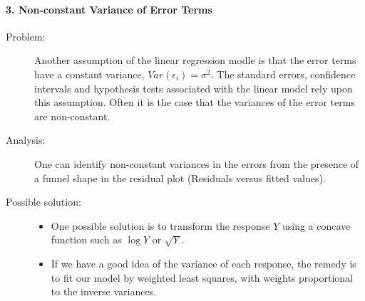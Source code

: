 \documentclass[a4paper]{article}
\begin{document}
						
						\paragraph{3. Non-constant Variance of Error Terms}
						\begin{description}
							\item[Problem:]	Another assumption of the linear regression modle is that the error terms have a constant variance, $Var(\epsilon_i) = \sigma^2$. The standard errors, confidence intervals and hypothesis tests associated with the linear model rely upon this assumption. Often it is the case that the variances of the error terms are non-constant.
							
							\item[Analysis:] One can identify non-constant variances in the errors from the presence of a funnel shape in the residual plot (Residuals versus fitted values).
							
							\item[Possible solution:] \quad
								\begin{itemize}
									\item One possible solution is to transform the response $Y$ using a concave function such as $\log Y$ or $\sqrt{Y}$.	
									\item If we have a good idea of the variance of each response, the remedy is to fit our model by weighted least squares, with weights proportional to the inverse variances.	
								\end{itemize}
						
						\end{description}
						
							
\end{document}
